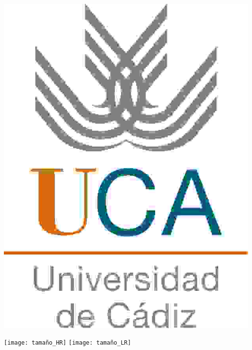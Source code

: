 \documentclass{beamer}
\begin{document}
\begin{frame}
    \includegraphics[scale=0.8]{uca_LR}


    \texttt{[image: tamaño\_HR]}
    \texttt{[image: tamaño\_LR]}
\end{frame}
\end{document}
